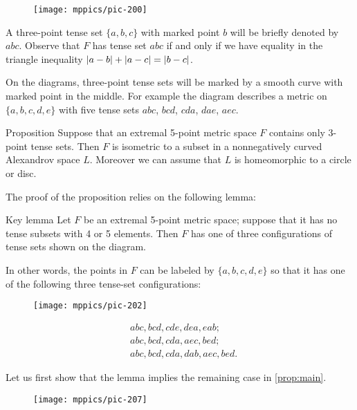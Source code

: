 \documentclass{article}
\begin{document}
\begin{wrapfigure}{r}{20mm}
\vskip-4mm
\centering
\texttt{[image: mppics/pic-200]}
\end{wrapfigure}

A three-point tense set $\{a,b,c\}$ with marked point $b$ will be briefly denoted by $abc$.
Observe that $F$ has tense set $abc$ if and only if we have equality in the triangle inequality $|a-b|+|a-c|\z=|b-c|$.

On the diagrams, three-point tense sets will be marked by a smooth curve with marked point in the middle.
For example the diagram describes a metric on $\{a,b,c,d,e\}$ with five tense sets $abc$, $bcd$, $cda$, $dae$, $aec$.

\begin{thm}{Proposition}\label{prop:3-tense}
Suppose that an extremal 5-point metric space $F$ contains only 3-point tense sets.
Then $F$ is isometric to a subset in a nonnegatively curved Alexandrov space $L$.
Moreover we can assume that $L$ is homeomorphic to a circle or disc.
\end{thm}

The proof of the proposition relies on the following lemma:

\begin{thm}{Key lemma}\label{lem:key}
Let $F$ be an extremal 5-point metric space; suppose that it has no tense subsets with 4 or 5 elements.
Then $F$ has one of three configurations of tense sets shown on the diagram.

In other words, the points in $F$ can be labeled by $\{a,b,c,d,e\}$ so that it has
one of the following three tense-set configurations:

\begin{wrapfigure}{r}{45mm}
\vskip3mm
\centering
\texttt{[image: mppics/pic-202]}
\end{wrapfigure}
\vskip-6mm
\begin{align*}
&abc, bcd, cde, dea, eab;
\\
&abc, bcd, cda, aec, bed;
\\
&abc, bcd, cda, dab, aec, bed.
\end{align*}

\end{thm}

Let us first show that the lemma implies the remaining case in \ref{prop:main}.

\begin{wrapfigure}{r}{20mm}
\vskip-4mm
\centering
\texttt{[image: mppics/pic-207]}
\end{wrapfigure}
\end{document}
